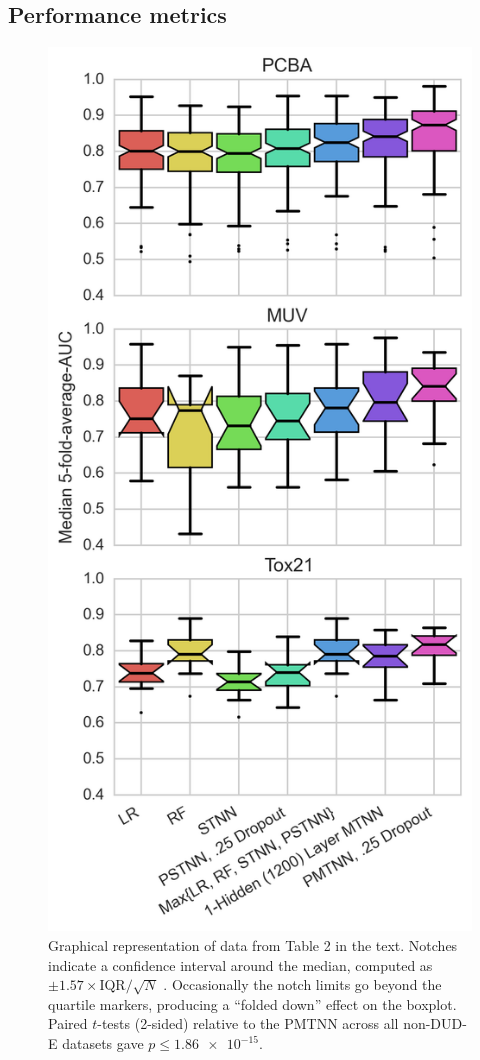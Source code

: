 \clearpage

\subsection{Performance metrics}

\begin{figure}[ht]
\centering
\includegraphics[height=0.9\textheight]{Images/table2boxplot.png}
\caption{Graphical representation of data from Table 2 in the text. Notches
  indicate a confidence interval around the median, computed as $\pm 1.57
  \times \text{IQR}/ \sqrt{N}$ \citep{mcgill1978variations}. Occasionally the
  notch limits go beyond the quartile markers, producing a ``folded down''
  effect on the boxplot. Paired $t$-tests (2-sided) relative to the PMTNN
  across all non-DUD-E datasets gave $p \le \num{1.86e-15}$.}
\label{fig:table2boxplot}
\end{figure}


